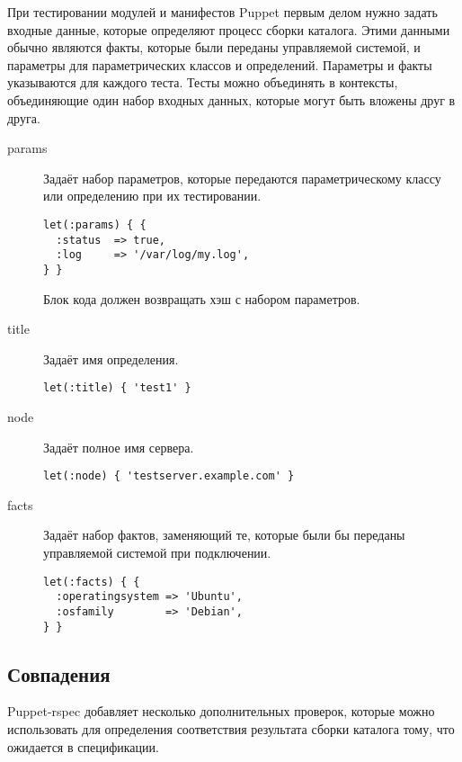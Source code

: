 При тестировании модулей и манифестов Puppet первым делом нужно задать входные данные, которые определяют процесс сборки каталога. Этими данными обычно являются факты, которые были переданы управляемой системой, и параметры для параметрических классов и определений. Параметры и факты указываются для каждого теста. Тесты можно объединять в контексты, объединяющие один набор входных данных, которые могут быть вложены друг в друга.

\begin{description}

\item[params]
Задаёт набор параметров, которые передаются параметрическому классу или определению при их тестировании.
\begin{lstlisting}
let(:params) { {
  :status  => true,
  :log     => '/var/log/my.log',
} }
\end{lstlisting}
Блок кода должен возвращать хэш с набором параметров.

\item[title]
Задаёт имя определения.
\begin{lstlisting}
let(:title) { 'test1' }
\end{lstlisting}

\item[node]
Задаёт полное имя сервера.
\begin{lstlisting}
let(:node) { 'testserver.example.com' }
\end{lstlisting}

\item[facts]
Задаёт набор фактов, заменяющий те, которые были бы переданы управляемой системой при подключении.
\begin{lstlisting}
let(:facts) { {
  :operatingsystem => 'Ubuntu',
  :osfamily        => 'Debian',
} }
\end{lstlisting}

\end{description}

\subsection{Совпадения}

Puppet-rspec добавляет несколько дополнительных проверок, которые можно использовать для определения соответствия результата сборки каталога тому, что ожидается в спецификации.

